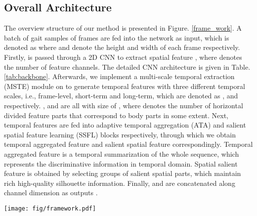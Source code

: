 \documentclass[journal]{IEEEtran}
\begin{document}
\subsection{Overall Architecture}
\label{overall_architecture}
The overview structure of our method is presented in Figure. \ref{frame_work}. A batch of  gait samples of  frames are fed into the network as input, which is denoted as  where  and  denote the height and width of each frame respectively. Firstly,  is passed through a 2D CNN to extract spatial feature , where  denotes the number of feature channels. The detailed CNN architecture is given in Table. \ref{tab:backbone}. Afterwards, we implement a multi-scale temporal extraction (MSTE) module on  to generate temporal features with three different temporal scales, i.e., frame-level, short-term and long-term, which are denoted as ,  and  respectively. ,  and  are all with size of , where  denotes the number of horizontal divided feature parts that correspond to body parts in some extent. Next, temporal features are fed into adaptive temporal aggregation (ATA) and salient spatial feature learning (SSFL) blocks respectively, through which we obtain temporal aggregated feature  and salient spatial feature  correspondingly. Temporal aggregated feature  is a temporal summarization of the whole sequence, which represents the discriminative information in temporal domain. Spatial salient feature  is obtained by selecting groups of salient spatial parts, which maintain rich high-quality silhouette information. Finally,  and  are concatenated along channel dimension as outputs .

\begin{figure*}[t]
\centering
\texttt{[image: fig/framework.pdf]}
\caption{Overview of MCAT. A sequence of gait silhouettes are firstly fed into a 2D CNN to extract spatial features in each frame. Then, a multi-scale temporal extraction (MSTE) module is utilized to obtain temporal features in three scales. Afterwards, a two-branch architecture composed of an adaptive temporal aggregation (ATA) module and a salient spatial feature learning (SSFL) module is formed to aggregate multi-scale features and select salient spatial parts respectively.  Arrows, , , ,  and  denote operations, input gait sequence, features processed by CNN, temporal aggregated features, salient spatial features and output features respectively.  and  represent triplet loss and cross-entropy loss respectively.}
\label{frame_work}
\end{figure*}
\end{document}
